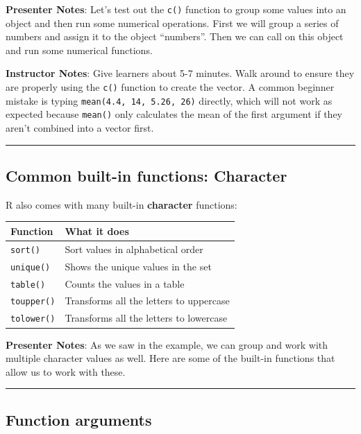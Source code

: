 \documentclass[
  letterpaper,
  DIV=11,
  numbers=noendperiod]{scrartcl}
\newcounter{none} %
\begin{document}
\textbf{Presenter Notes}: Let's test out the \texttt{c()} function to
group some values into an object and then run some numerical operations.
First we will group a series of numbers and assign it to the object
``numbers''. Then we can call on this object and run some numerical
functions.

\textbf{Instructor Notes}: Give learners about 5-7 minutes. Walk around
to ensure they are properly using the \texttt{c()} function to create
the vector. A common beginner mistake is typing
\texttt{mean(4.4,\ 14,\ 5.26,\ 26)} directly, which will not work as
expected because \texttt{mean()} only calculates the mean of the first
argument if they aren't combined into a vector first.

\begin{center}\rule{0.5\linewidth}{0.5pt}\end{center}

\subsection{Common built-in functions:
Character}\label{common-built-in-functions-character}

R also comes with many built-in \textbf{character} functions:

{\def\LTcaptype{none} %
\begin{longtable}[]{@{}ll@{}}
\toprule\noalign{}
Function & What it does \\
\midrule\noalign{}
\endhead
\bottomrule\noalign{}
\endlastfoot
\texttt{sort()} & Sort values in alphabetical order \\
\texttt{unique()} & Shows the unique values in the set \\
\texttt{table()} & Counts the values in a table \\
\texttt{toupper()} & Transforms all the letters to uppercase \\
\texttt{tolower()} & Transforms all the letters to lowercase \\
\end{longtable}
}

\textbf{Presenter Notes}: As we saw in the example, we can group and
work with multiple character values as well. Here are some of the
built-in functions that allow us to work with these.

\begin{center}\rule{0.5\linewidth}{0.5pt}\end{center}

\subsection{Function arguments}\label{function-arguments}
\end{document}
